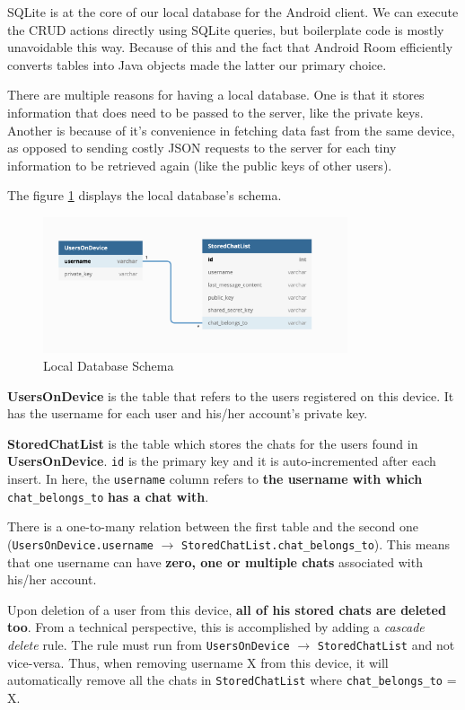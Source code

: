 SQLite is at the core of our local database for the Android client. We can execute the CRUD actions directly using SQLite queries, but boilerplate code is mostly unavoidable this way. Because of this and the fact that Android Room efficiently converts tables into Java objects made the latter our primary choice.

There are multiple reasons for having a local database. One is that it stores information that does need to be passed to the server, like the private keys. Another is because of it's convenience in fetching data fast from the same device, as opposed to sending costly JSON requests to the server for each tiny information to be retrieved again (like the public keys of other users).

The figure \ref{androidLocalDatabase} displays the local database's schema.

\begin{figure}[H]
 \centering
  \includegraphics[width=0.8\textwidth]{images/AndroidLocalDatabase.png}
  \caption{Local Database Schema}
  \label{androidLocalDatabase}
\end{figure}

\textbf{UsersOnDevice} is the table that refers to the users registered on this device. It has the username for each user and his/her account's private key.

\textbf{StoredChatList} is the table which stores the chats for the users found in \textbf{UsersOnDevice}. \verb|id| is the primary key and it is auto-incremented after each insert. In here, the \verb|username| column refers to \textbf{the username with which} \verb|chat_belongs_to| \textbf{has a chat with}.

There is a one-to-many relation between the first table and the second one \\ (\verb|UsersOnDevice.username| $\rightarrow$ \verb|StoredChatList.chat_belongs_to|). This means that one username can have \textbf{zero, one or multiple chats} associated with his/her account.

Upon deletion of a user from this device, \textbf{all of his stored chats are deleted too}. From a technical perspective, this is accomplished by adding a {\it{cascade delete}} rule. The rule must run from \verb|UsersOnDevice| $\rightarrow$ \verb|StoredChatList| and not vice-versa. Thus, when removing username X from this device, it will automatically remove all the chats in \verb|StoredChatList| where \verb|chat_belongs_to| = X.

